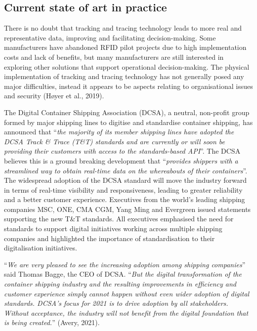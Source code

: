 \documentclass[
]{book}
\begin{document}
\hypertarget{current-state-of-art-in-practice-28}{%
\subsection*{Current state of art in practice}\label{current-state-of-art-in-practice-28}}

There is no doubt that tracking and tracing technology leads to more real and representative data, improving and facilitating decision-making. Some manufacturers have abandoned RFID pilot projects due to high implementation costs and lack of benefits, but many manufacturers are still interested in exploring other solutions that support operational decision-making. The physical implementation of tracking and tracing technology has not generally posed any major difficulties, instead it appears to be aspects relating to organisational issues and security (Høyer et al., 2019).

The Digital Container Shipping Association (DCSA), a neutral, non-profit group formed by major shipping lines to digitise and standardise container shipping, has announced that ``\emph{the majority of its member shipping lines have adopted the DCSA Track \& Trace (T\&T) standards and are currently or will soon be providing their customers with access to the standards-based API}''.
The DCSA believes this is a ground breaking development that ``\emph{provides shippers with a streamlined way to obtain real-time data on the whereabouts of their containers}''. The widespread adoption of the DCSA standard will move the industry forward in terms of real-time visibility and responsiveness, leading to greater reliability and a better customer experience.
Executives from the world's leading shipping companies MSC, ONE, CMA CGM, Yang Ming and Evergreen issued statements supporting the new T\&T standards. All executives emphasised the need for standards to support digital initiatives working across multiple shipping companies and highlighted the importance of standardisation to their digitalisation initiatives.

``\emph{We are very pleased to see the increasing adoption among shipping companies}'' said Thomas Bagge, the CEO of DCSA. ``\emph{But the digital transformation of the container shipping industry and the resulting improvements in efficiency and customer experience simply cannot happen without even wider adoption of digital standards. DCSA's focus for 2021 is to drive adoption by all stakeholders. Without acceptance, the industry will not benefit from the digital foundation that is being created.}'' (Avery, 2021).
\end{document}
